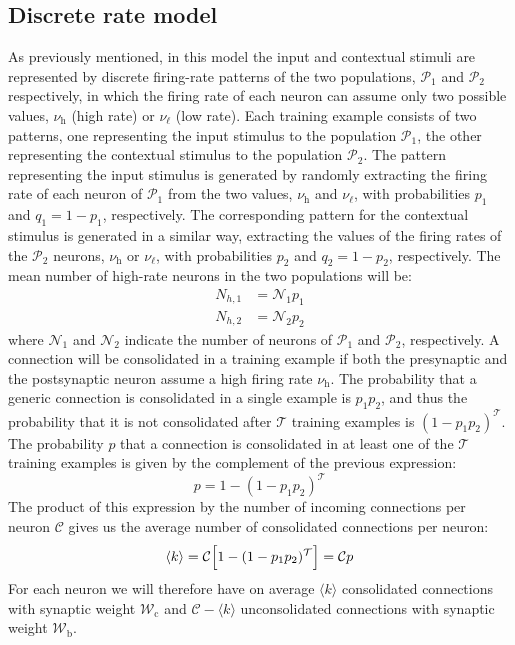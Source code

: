 \documentclass[a4paper, 12pt, twoside, openright]{book}
\newcommand{\popI}{\mathcal{P}_1}
\newcommand{\popII}{\mathcal{P}_2}
\newcommand{\NI}{\mathcal{N}_1}
\newcommand{\NII}{\mathcal{N}_2}
\newcommand{\T}{\mathcal{T}}
\newcommand{\rh}{\nu_\text{h}}
\newcommand{\rl}{\nu_{\ell}}
\newcommand{\C}{\mathcal{C}}
\newcommand{\Wb}{\mathcal{W}_\text{b}}
\newcommand{\Wc}{\mathcal{W}_\text{c}}
\begin{document}
\subsection{\label{subsubseq:rate-discr} Discrete rate model}
As previously mentioned, in this model the input and contextual stimuli are represented by discrete firing-rate patterns of the two populations, $\popI$ and $\popII$ respectively, in which the firing rate of each neuron can assume only two possible values, $\rh$ (high rate) or $\rl$ (low rate). Each training example consists of two patterns, one representing the input stimulus to the population $\popI$,
the other representing the contextual stimulus to the population $\popII$. The pattern representing the input stimulus is generated by randomly extracting the firing rate of each neuron of $\popI$ from the two values, $\rh$ and $\rl$, with probabilities $p_1$ and $q_1 = 1-p_1$, respectively. The corresponding pattern for the contextual stimulus is generated in a similar way, extracting the values of the firing rates of the $\popII$ neurons, $\rh$ or $\rl$, with probabilities $p_2$ and
$q_2 = 1-p_2$, respectively.
The mean number of high-rate neurons in the two populations will be:
\begin{equation}
\label{eq:Nh}
\begin{split}
     N_{h,1}&=\NI p_1 \\
     N_{h,2}&=\NII p_2
     \end{split}
\end{equation}
where $\NI$ and $\NII$ indicate the number of neurons of $\popI$ and $\popII$, respectively.
A connection will be consolidated in a training example if both the presynaptic and the postsynaptic neuron assume a high firing rate $\rh$.
The probability that a generic connection is consolidated in a single example is $p_1 p_2$, and thus the probability that it is not consolidated after $\T$ training examples is
$(1-p_1p_2)^{\T}$.
The probability $p$ that a connection is consolidated in at least one of the $\T$ training examples is given by the complement of the previous expression:
\begin{equation}
\label{eq:p}
     p= 1-(1-p_1 p_2)^\T
\end{equation}
The product of this expression by the number of incoming connections per neuron $\C$ gives us the average number of consolidated connections per neuron:
\begin{equation}
\label{eq:av_k}
     \langle k \rangle=\C \Bigl[ 1 - (1-p_1p_2)^{\T} \Bigr] = \C p
\end{equation}
For each neuron we will therefore have on average $\langle k \rangle$ consolidated connections with synaptic weight $\Wc$ and $\C- \langle k \rangle$ unconsolidated connections with synaptic weight $\Wb$.
\end{document}

